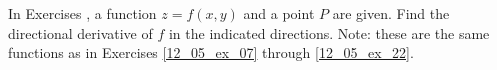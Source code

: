 {\noindent In Exercises}
{, a function $z=f(x,y)$ and a point $P$ are given. Find the directional derivative of $f$ in the indicated directions. Note: these are the same functions as in Exercises \ref{12_05_ex_07} through \ref{12_05_ex_22}.
}
